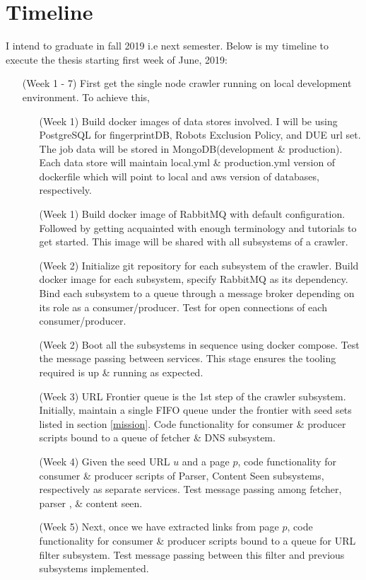 \chapter{Timeline}
I intend to graduate in fall 2019 i.e next semester. Below is my timeline to execute the thesis starting
first week of June, 2019:
\begin{itemize}
\item[(Week 1 - 7)] First get the single node crawler running on local development environment. To achieve this,
  \begin{itemize}
  \item[(Week 1)] Build docker images of data stores involved. I will be using PostgreSQL for
    fingerprintDB, Robots Exclusion Policy, and DUE url set. The job data will be stored in MongoDB(development \& production). Each data store will maintain local.yml \& production.yml version of dockerfile which will point to local and aws version of databases, respectively.
  \item[(Week 1)] Build docker image of RabbitMQ with default configuration. Followed by getting acquainted with enough terminology and tutorials to get started. This image will be shared with all subsystems of a
    crawler.
  \item [(Week 2)]Initialize git repository for each subsystem of the crawler. Build docker image for each subsystem,
    specify RabbitMQ as its dependency. Bind each subsystem to a queue through a message broker depending on its role as a consumer/producer. Test for open connections of each consumer/producer.
  \item[(Week 2)] Boot all the subsystems in sequence using docker compose. Test the message passing between services. This stage ensures the tooling required is up \& running as expected.
  \item[(Week 3)] URL Frontier queue is the 1st step of the crawler subsystem. Initially, maintain a single FIFO queue under the frontier with seed sets listed in section \ref{mission}. Code functionality for consumer \& producer scripts bound to a queue of fetcher \& DNS subsystem. 
  \item[(Week 4)] Given the seed URL $u$ and a page $p$, code functionality for consumer \& producer scripts of Parser, Content Seen subsystems, respectively as separate services. Test message passing among fetcher, parser , \& content seen.
  \item[(Week 5)]  Next, once we have extracted links from page $p$, code functionality for consumer \& producer scripts bound to a queue for URL filter subsystem. Test message passing between this filter and previous subsystems implemented.

\end{itemize}
\end{itemize}
